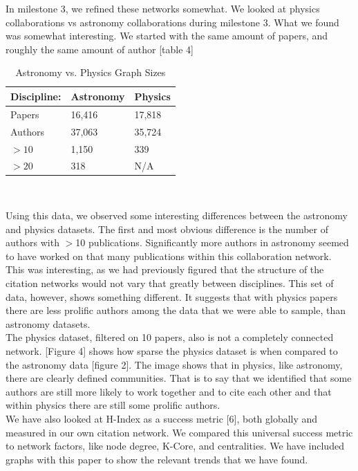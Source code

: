 \documentclass[times, 10pt,twocolumn]{article}
\begin{document}
In milestone 3, we refined these networks somewhat. We looked at physics collaborations vs astronomy collaborations during milestone 3. What we found was somewhat interesting. We started with the same amount of papers, and roughly the same amount of author [table 4] \\

\begin{table}[h]
\centering
\caption{Astronomy vs. Physics Graph Sizes}
\label{my-label}
    \begin{tabular}{ | l | l | l |}
    \hline
    Discipline: & Astronomy & Physics \\ \hline
    Papers & 16,416 & 17,818  \\ \hline
    Authors & 37,063 & 35,724 \\ \hline
    $> 10$ & 1,150 & 339 \\ \hline
    $> 20$ & 318 & N/A \\ \hline
    \end{tabular}\\
\end{table}

Using this data, we observed some interesting differences between the astronomy and physics datasets. The first and most obvious difference is the number of authors with $>$10 publications. Significantly more authors in astronomy seemed to have worked on that many publications within this collaboration network. \\

This was interesting, as we had previously figured that the structure of the citation networks would not vary that greatly between disciplines. This set of data, however, shows something different. It suggests that with physics papers there are less prolific authors among the data that we were able to sample, than astronomy datasets. \\

The physics dataset, filtered on 10 papers, also is not a completely connected network. [Figure 4] shows how sparse the physics dataset is when compared to the astronomy data [figure 2]. The image shows that in physics, like astronomy, there are clearly defined communities. That is to say that we identified that some authors are still more likely to work together and to cite each other and that within physics there are still some prolific authors. \\

We have also looked at H-Index as a success metric [6], both globally and measured in our own citation network. We compared this universal success metric to network factors, like node degree, K-Core, and centralities. We have included graphs with this paper to show the relevant trends that we have found. \\
\end{document}
